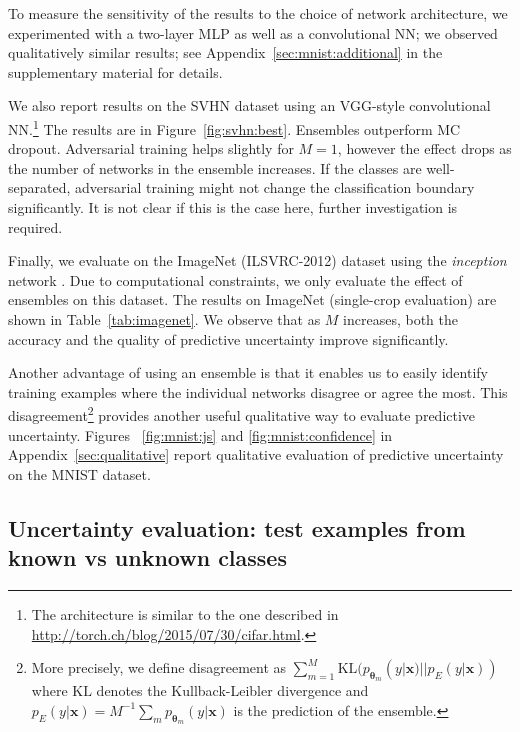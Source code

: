 \documentclass{article}
\newcommand{\bx}{\mathbf{x}}
\newcommand{\btheta}{\mathbf{\theta}}
\newcommand{\KL}{\mathrm{KL}}
\begin{document}
{To measure the sensitivity of the results to the choice of network architecture, we experimented with a two-layer MLP as well as a convolutional NN; we observed qualitatively similar results; see Appendix~\ref{sec:mnist:additional} in the supplementary material for details. 


We also report results on the SVHN dataset using an VGG-style convolutional NN.\footnote{The architecture is similar to the one described in \url{http://torch.ch/blog/2015/07/30/cifar.html}. } %
The results are in Figure~\ref{fig:svhn:best}. Ensembles outperform MC dropout. Adversarial training helps slightly for $M=1$, however the effect drops as the number of networks in the ensemble increases. %
If the classes are well-separated, adversarial training might not change the classification boundary significantly. 
It is not clear if this is the case here,  further investigation is required.




Finally, we evaluate on the ImageNet (ILSVRC-2012) dataset \citep{imagenet} using the \emph{inception} network \citep{inception}. Due to computational constraints, we only evaluate the effect of ensembles on this dataset. The results on ImageNet (single-crop evaluation) are shown in Table~\ref{tab:imagenet}. %
We observe that as $M$ increases, both the accuracy and the quality of predictive uncertainty improve significantly. 











Another advantage of using an ensemble is that it enables us to easily identify training examples where the individual networks disagree or agree the most. This disagreement\footnote{More precisely, we define disagreement as $\sum_{m=1}^M \KL(p_{\btheta_m}(y|\bx)||p_{E}(y|\bx))$ where $\KL$ denotes the Kullback-Leibler divergence and $p_{E}(y|\bx)=M^{-1}\sum_{m} p_{\btheta_m}(y|\bx)$ is the prediction of the ensemble.}  provides another useful qualitative way to evaluate predictive uncertainty.  %
Figures~ \ref{fig:mnist:js} and \ref{fig:mnist:confidence} in Appendix~\ref{sec:qualitative} report qualitative evaluation of predictive uncertainty on the MNIST dataset. 





\subsection{
Uncertainty evaluation: test examples from known vs unknown classes
}

}
\end{document}
